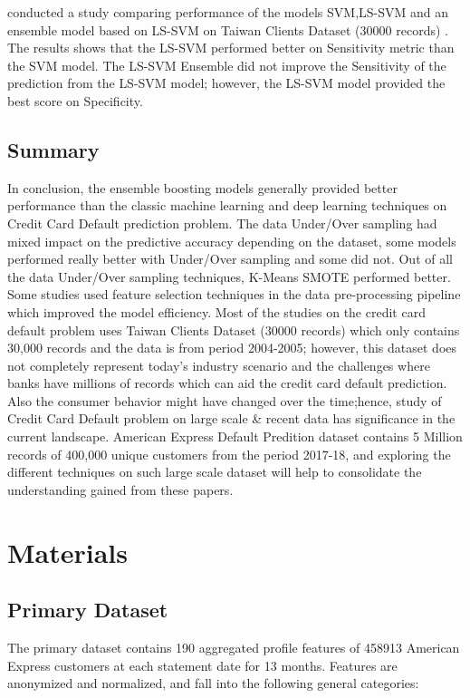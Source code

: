 \documentclass[twoside,11pt,a4paper]{article}
\begin{document}
\citep{lawi2018classification} conducted a study comparing performance of the models \acs{SVM},\acf{LS-SVM} \citep{suykens1999least}  and an ensemble model based on \acs{LS-SVM}  on Taiwan Clients Dataset (30000 records) \citep{yeh2009comparisons}. The results shows that the \acs{LS-SVM} performed better on Sensitivity metric than the \acs{SVM} model. The \acs{LS-SVM} Ensemble did not improve the Sensitivity of the prediction from the \acs{LS-SVM} model; however, the \acs{LS-SVM} model provided the best score on Specificity. \\

\subsection{Summary}
In conclusion, the ensemble boosting models generally provided better performance than the classic machine learning and deep learning techniques on Credit Card Default prediction problem. The data Under/Over sampling had mixed impact on the predictive accuracy depending on the dataset, some models performed really better with Under/Over sampling and some did not. Out of all the data Under/Over sampling techniques, K-Means \acs{SMOTE} performed better. Some studies used feature selection techniques in the data pre-processing pipeline which improved the model efficiency. Most of the studies on the credit card default problem uses Taiwan Clients Dataset (30000 records) \citep{yeh2009comparisons} which only contains 30,000 records and the data is from period 2004-2005; however, this dataset does not completely represent today's industry scenario and the challenges where banks have millions of records which can aid the credit card default prediction. Also the consumer behavior might have changed over the time;hence, study of Credit Card Default problem on large scale \& recent data has significance in the current landscape. American Express Default Predition  dataset \citep{amex-default-prediction-dataset} contains 5 Million records of 400,000 unique customers from the period 2017-18, and exploring the different techniques on such large scale dataset will help to consolidate the understanding gained from these papers.

\vfill
\clearpage
\section{Materials}\label{sec:materials}

\subsection{Primary Dataset}
The primary dataset contains 190 aggregated profile features of 458913 American Express customers at each statement date for 13 months. Features are anonymized and normalized, and fall into the following general categories:
\end{document}
